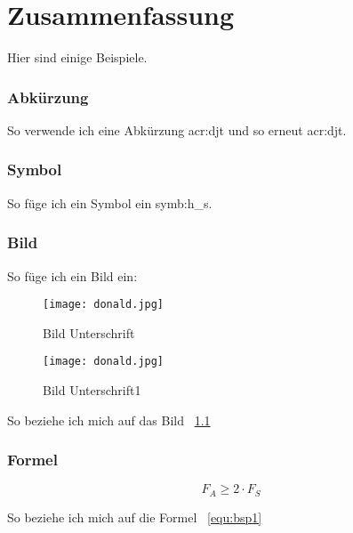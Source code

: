 
\chapter{Zusammenfassung}
\label{sec:conclusion_future-work}


Hier sind einige Beispiele.

\subsection{Abkürzung}
\label{subsec:abkürzung}

So verwende ich eine Abkürzung \gls{acr:djt} und so erneut \gls{acr:djt}.


\subsection{Symbol}
\label{subsec:symbol}
So füge ich ein Symbol ein \gls{symb:h_s}.


\subsection{Bild}
\label{subsec:Bild}
So füge ich ein Bild ein:

\begin{figure}[H]
	\centering
	\texttt{[image: donald.jpg]}
	\caption[Titel für das Abbildungsverzeichnis]{Bild Unterschrift} \cite{wangVisibleLightCommunications2017}
	\label{fig:donald}
\end{figure}


\begin{figure}[H]
	\centering
	\texttt{[image: donald.jpg]}
	\caption[Titel für das Abbildungsverzeichnis1]{Bild Unterschrift1 \cite{stinyAktiveElektronischeBauelemente2019}}
	\label{fig:donald1}
\end{figure}


So beziehe ich mich auf das Bild ~\ref{fig:donald}

\subsection{Formel}
\label{subsec:formel}

\begin{equation}
	\label{equ:bsp1}
	F_{A} \geq 2 \cdot F_{S}
\end{equation}

So beziehe ich mich auf die Formel ~\ref{equ:bsp1}


